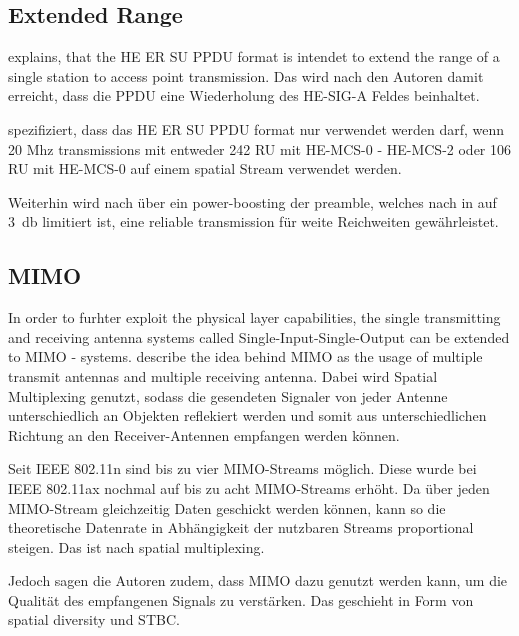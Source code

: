 \documentclass[]{nsm-thesis}
\begin{document}




\subsection{Extended Range}

\textcite{Deng} explains, that the HE ER SU \ac{PPDU} format is intendet to extend the range of a single station to access point transmission. Das wird nach den Autoren damit erreicht, dass die PPDU eine Wiederholung des HE-SIG-A Feldes beinhaltet.

\cite{Standard} spezifiziert, dass das HE ER SU PPDU format nur verwendet werden  darf, wenn 20 Mhz transmissions mit entweder 242 RU mit HE-MCS-0 - HE-MCS-2 oder 106 RU mit HE-MCS-0 auf einem spatial Stream verwendet werden.

Weiterhin wird nach \cite{Deng} über ein power-boosting der preamble, welches nach in \cite{standard} auf \SI{3}{\decibel} limitiert ist,  eine reliable transmission für weite Reichweiten gewährleistet. 



\subsection{\ac{MIMO}}
In order to furhter exploit the physical layer capabilities, the single transmitting and receiving antenna systems called Single-Input-Single-Output can be extended to \ac{MIMO} - systems.
 \textcite{sauter} describe the idea behind \ac{MIMO} as the usage of multiple transmit antennas and multiple receiving antenna. Dabei wird Spatial Multiplexing genutzt, sodass die gesendeten Signaler von jeder Antenne unterschiedlich an Objekten reflekiert werden und somit aus unterschiedlichen Richtung an den Receiver-Antennen empfangen werden können. 
 
Seit IEEE 802.11n sind bis zu vier MIMO-Streams möglich. Diese wurde bei IEEE 802.11ax nochmal auf bis zu acht MIMO-Streams erhöht. Da über jeden MIMO-Stream gleichzeitig Daten geschickt werden können, kann so die theoretische Datenrate in Abhängigkeit der nutzbaren Streams proportional steigen. Das ist nach \textcite{abbas} spatial multiplexing.

Jedoch sagen die Autoren zudem, dass MIMO dazu genutzt werden kann, um die Qualität des empfangenen Signals zu verstärken.  Das geschieht in Form von spatial diversity und \ac{STBC}.
\end{document}
